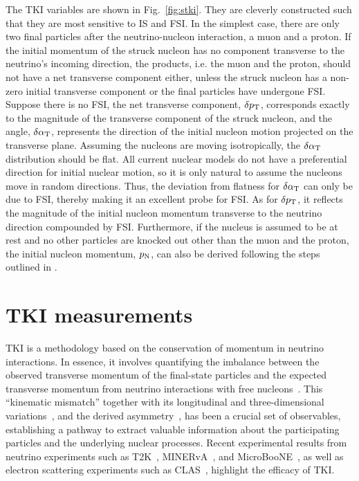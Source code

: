 The TKI variables are shown in Fig.~\ref{fig:stki}. They are cleverly constructed such that they are most sensitive to IS and FSI. 
In the simplest case, there are only two final particles after the neutrino-nucleon interaction, a muon and a proton. 
If the initial momentum of the struck nucleon has no component transverse to the neutrino's incoming direction, the products, i.e. the muon and the proton, should not have a net transverse component either, unless the struck nucleon has a non-zero initial transverse component or the final particles have undergone FSI.
Suppose there is no FSI, the net transverse component, $\delta p_\textrm{T}$, corresponds exactly to the magnitude of the transverse component of the struck nucleon, and the angle, $\delta\alpha_\textrm{T}$, represents the direction of the initial nucleon motion projected on the transverse plane. 
Assuming the nucleons are moving isotropically, the $\delta\alpha_\textrm{T}$ distribution should be flat. 
All current nuclear models do not have a preferential direction for initial nuclear motion, so it is only natural to assume the nucleons move in random directions. 
Thus, the deviation from flatness for $\delta\alpha_\textrm{T}$ can only be due to FSI, thereby making it an excellent probe for FSI. 
As for $\delta p_\textrm{T}$, it reflects the magnitude of the initial nucleon momentum transverse to the neutrino direction compounded by FSI. 
Furthermore, if the nucleus is assumed to be at rest and no other particles are knocked out other than the muon and the proton, the initial nucleon momentum, $p_\textrm{N}$, can also be derived following the steps outlined in \cite{pnpaper}. 
 

\section{TKI measurements}\label{sec:tki}

TKI is a methodology based on the conservation of momentum in neutrino interactions. In essence, it involves quantifying the imbalance between the observed transverse momentum of the final-state particles and the expected transverse momentum from neutrino interactions with free nucleons~\cite{Lu:2015hea, Lu:2015tcr}. This ``kinematic mismatch'' together with its longitudinal and three-dimensional variations~\cite{Furmanski:2016wqo, Lu:2019nmf}, and the derived asymmetry~\cite{Cai:2019jzk}, has been a crucial set of observables, establishing a pathway to extract valuable information about the participating particles and the underlying nuclear processes. Recent experimental results from neutrino experiments such as  T2K~\cite{T2K:2018rnz, T2K:2021naz}, MINERvA~\cite{MINERvA:2018hba, MINERvA:2019ope, MINERvA:2020anu, MINERvA:2021csy}, and MicroBooNE~\cite{MicroBooNE:2022emb, MicroBooNE:2023cmw, MicroBooNE:2023tzj, MicroBooNE:2023wzy, MicroBooNE:2024tmp}, as well as electron scattering experiments such as  CLAS~\cite{CLAS:2021neh}, highlight the efficacy of TKI. 

